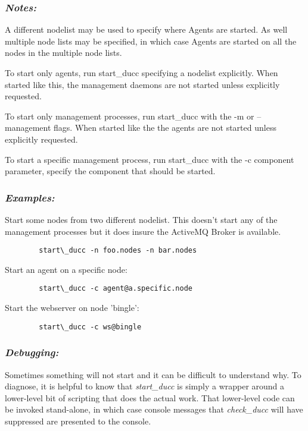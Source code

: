       \subsubsection{{\em Notes: }}
      A different nodelist may be used to specify where Agents are started. As well multiple node 
      lists may be specified, in which case Agents are started on all the nodes in the multiple node 
      lists. 
      
      To start only agents, run start\_ducc specifying a nodelist explicitly. When started like this, the 
      management daemons are not started unless explicitly requested. 
      
      To start only management processes, run start\_ducc with the -m or --management flags. When 
      started like the the agents are not started unless explicitly requested. 
      
      To start a specific management process, run start\_ducc with the -c component parameter, 
      specify the component that should be started. 
      
      \subsubsection{{\em Examples: }}

      Start some nodes from two different nodelist.  This doesn't start any of the management processes
      but it does insure the ActiveMQ Broker is available.
\begin{verbatim}
        start\_ducc -n foo.nodes -n bar.nodes 
\end{verbatim}
                  
      Start an agent on a specific node: 
\begin{verbatim}
        start\_ducc -c agent@a.specific.node 
\end{verbatim}
      
      Start the webserver on node 'bingle': 
\begin{verbatim}
        start\_ducc -c ws@bingle 
\end{verbatim}

      \subsubsection{{\em Debugging:}}

      Sometimes something will not start and it can be difficult to understand why.  To diagnose, it is
      helpful to know that {\em start\_ducc} is simply a wrapper around a lower-level bit of scripting
      that does the actual work.  That lower-level code can be invoked stand-alone, in which case
      console messages that {\em check\_ducc} will have suppressed are presented to the console.

